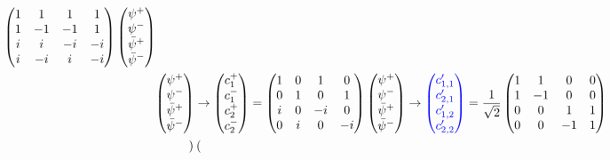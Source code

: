 \documentclass[a4paper,11pt]{article}
\theoremstyle{remark}
\newcommand{\ra}{\rightarrow}
\newcommand{\psibar}{\bar{\psi}}
\newcommand*{\mathcolor}{}  %
\def\mathcolor#1#{\mathcoloraux{#1}}
\newcommand*{\mathcoloraux}[3]{%
  \protect\leavevmode
  \begingroup
    \color#1{#2}#3%
  \endgroup
}
\begin{document}
\begin{align*}
\begin{aligned}
{\begin{pmatrix}
   1 & 1 & 1 & 1\\ 1 & -1 & -1 & 1 \\ i & i & -i & -i\\ i & -i & i & -i
   \end{pmatrix}}
   \begin{pmatrix} 
   \psi^+ \\ \psi^- \\ \psibar^+ \\ \psibar^-
   \end{pmatrix}
   \end{aligned} \\
  &\begin{aligned}
    \begin{pmatrix} 
    \psi^+ \\ \psi^- \\ \psibar^+ \\ \psibar^-
    \end{pmatrix}
    & \ra 
    \begin{pmatrix} 
    c_1^+ \\ c_1^- \\ c_2^+ \\ c_2^-
    \end{pmatrix}
    =
    \begin{pmatrix}
   1 & 0 & 1 & 0\\ 0 & 1 & 0 & 1 \\  i & 0 & -i & 0\\ 0 & i & 0 & -i 
   \end{pmatrix}
   \begin{pmatrix} 
    \psi^+ \\ \psi^- \\ \psibar^+ \\ \psibar^-
   \end{pmatrix}
   \ra
   \mathcolor{blue}{\begin{pmatrix}
   c'_{1,1}\\ c'_{2,1} \\ c'_{1,2} \\ c'_{2,2} 
   \end{pmatrix}}
   = \frac{1}{\sqrt{2}}
   \begin{pmatrix}
   1 & 1 & 0 & 0\\ 1 & -1 & 0 & 0 \\ 0 & 0 & 1 & 1\\ 0 & 0 & -1 & 1 
   \end{pmatrix}\\
   & \begin{pmatrix}

\end{pmatrix}
\end{aligned}
\end{align*}
\end{document}
